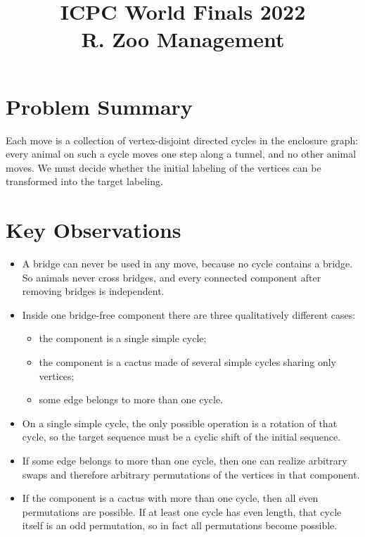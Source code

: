\documentclass[11pt]{article}
\title{ICPC World Finals 2022\\R. Zoo Management}
\author{}
\date{}
\begin{document}
\maketitle

\section*{Problem Summary}

Each move is a collection of vertex-disjoint directed cycles in the enclosure graph: every animal on such a
cycle moves one step along a tunnel, and no other animal moves. We must decide whether the initial
labeling of the vertices can be transformed into the target labeling.

\section*{Key Observations}

\begin{itemize}[leftmargin=*]
    \item A bridge can never be used in any move, because no cycle contains a bridge. So animals never
    cross bridges, and every connected component after removing bridges is independent.
    \item Inside one bridge-free component there are three qualitatively different cases:
    \begin{itemize}[leftmargin=*]
        \item the component is a single simple cycle;
        \item the component is a cactus made of several simple cycles sharing only vertices;
        \item some edge belongs to more than one cycle.
    \end{itemize}
    \item On a single simple cycle, the only possible operation is a rotation of that cycle, so the target
    sequence must be a cyclic shift of the initial sequence.
    \item If some edge belongs to more than one cycle, then one can realize arbitrary swaps and therefore
    arbitrary permutations of the vertices in that component.
    \item If the component is a cactus with more than one cycle, then all even permutations are possible.
    If at least one cycle has even length, that cycle itself is an odd permutation, so in fact all
    permutations become possible.
\end{itemize}
\end{document}
